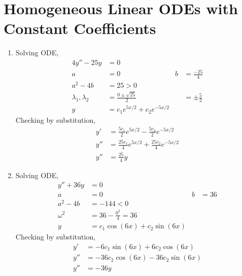 \section{Homogeneous Linear ODEs with Constant Coefficients}

\begin{enumerate}
    \item Solving ODE,
          \begin{align}
              4y'' - 25y               & = 0                                \\
              a                        & = 0                              &
              b                        & = \frac{-25}{4}                    \\
              a^{2} - 4b               & = 25 > 0                           \\
              \lambda_{1}, \lambda_{2} & = \frac{0 \pm \sqrt{25}}{2}      &
                                       & = \pm \frac{5}{2}                  \\
              y                        & = c_{1}e^{5x/2} + c_{2}e^{-5x/2}
          \end{align}
          Checking by substitution,
          \begin{align}
              y'  & = \frac{5c_{1}}{2}e^{5x/2} - \frac{5c_{2}}{2}e^{-5x/2}   \\
              y'' & = \frac{25c_{1}}{4}e^{5x/2} + \frac{25c_{2}}{4}e^{-5x/2} \\
              y'' & = \frac{25}{4}y
          \end{align}

    \item Solving ODE,
          \begin{align}
              y'' + 36y  & = 0                                        \\
              a          & = 0                             & b & = 36 \\
              a^{2} - 4b & = -144 < 0                                 \\
              \omega^{2} & = 36 - \frac{0^{2}}{4} = 36                \\
              y          & = c_{1}\cos(6x) + c_{2}\sin(6x)
          \end{align}
          Checking by substitution,
          \begin{align}
              y'  & = -6c_{1}\sin(6x) + 6c_{2}\cos(6x)   \\
              y'' & = -36c_{2}\cos(6x) - 36c_{2}\sin(6x) \\
              y'' & = -36y
          \end{align}


\end{enumerate}
